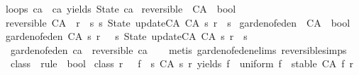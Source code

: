 \begin{isabellebody}
{\isachardoublequoteopen}loops\ ca\ {\isasymequiv}\ ca\ yields\ State\ ca{\isachardoublequoteclose}\isanewline
\isanewline
{}\isamarkupfalse%
\ reversible\ {\isacharcolon}{\isacharcolon}\ {\isachardoublequoteopen}CA\ {\isasymRightarrow}\ bool{\isachardoublequoteclose}\ \isanewline
{\isachardoublequoteopen}reversible\ {\isacharparenleft}CA\ {\isacharunderscore}\ r{\isacharparenright}\ {\isacharequal}\ {\isacharparenleft}{\isasymforall}s{\isachardot}\ {\isacharparenleft}{\isasymexists}{\isacharbang}s{}{\isachardot}\ State\ {\isacharparenleft}update{\isacharunderscore}CA\ {\isacharparenleft}CA\ s{}\ r{\isacharparenright}{\isacharparenright}\ {\isacharequal}\ s{\isacharparenright}{\isacharparenright}{\isachardoublequoteclose}\isanewline
\isanewline
{}\isamarkupfalse%
\ garden{\isacharunderscore}of{\isacharunderscore}eden\ {\isacharcolon}{\isacharcolon}\ {\isachardoublequoteopen}CA\ {\isasymRightarrow}\ bool{\isachardoublequoteclose}\ \isanewline
{\isachardoublequoteopen}garden{\isacharunderscore}of{\isacharunderscore}eden\ {\isacharparenleft}CA\ s\ r{\isacharparenright}\ {\isacharequal}\ {\isacharparenleft}{\isasymnot}{\isacharparenleft}{\isasymexists}\ s{}{\isachardot}\ State\ {\isacharparenleft}update{\isacharunderscore}CA\ {\isacharparenleft}CA\ s{}\ r{\isacharparenright}{\isacharparenright}\ {\isacharequal}\ s{\isacharparenright}{\isacharparenright}{\isachardoublequoteclose}\isanewline
\isanewline
{}\isamarkupfalse%
\ {\isachardoublequoteopen}garden{\isacharunderscore}of{\isacharunderscore}eden\ ca\ {\isasymLongrightarrow}\ {\isasymnot}reversible\ ca{\isachardoublequoteclose}\isanewline
%
\isadelimproof
\ \ %
\endisadelimproof
%
\isatagproof
{}\isamarkupfalse%
\ {\isacharparenleft}metis\ garden{\isacharunderscore}of{\isacharunderscore}eden{\isachardot}elims{\isacharparenleft}{}{\isacharparenright}\ reversible{\isachardot}simps{\isacharparenright}%
\endisatagproof
{\isafoldproof}%
%
\isadelimproof
\isanewline
%
\endisadelimproof
\isanewline
\isanewline
{}\isamarkupfalse%
\ class{}\ {\isacharcolon}{\isacharcolon}\ {\isachardoublequoteopen}rule\ {\isasymRightarrow}\ bool{\isachardoublequoteclose}\ \isanewline
{\isachardoublequoteopen}class{}\ r\ {\isasymequiv}\ {\isacharparenleft}{\isasymexists}{\isacharbang}\ f{\isachardot}\ {\isacharparenleft}{\isasymforall}\ s{\isachardot}\ {\isacharparenleft}CA\ s\ r{\isacharparenright}\ yields\ f\ {\isasymand}\ uniform\ f\ {\isasymand}\ stable\ {\isacharparenleft}CA\ f\ r{\isacharparenright}{\isacharparenright}{\isacharparenright}{\isachardoublequoteclose}\isanewline

\end{isabellebody}
